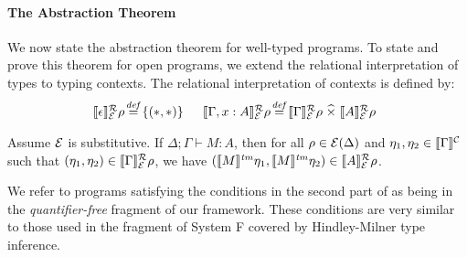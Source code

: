 \paragraph{The Abstraction Theorem}

We now state the abstraction theorem for well-typed programs. To state
and prove this theorem for open programs, we extend the
relational interpretation of types to typing contexts. The relational
interpretation of contexts is defined by: %
\begin{displaymath}
  \begin{array}{@{}l@{\hspace{0.1em}\isDefinedAs\hspace{0.1em}}l@{\hspace{1.5em}}l@{\hspace{0.1em}\isDefinedAs\hspace{0.1em}}l}
    \rsem{\epsilon}{\relEnv{E}}{\rho} & \{(*,*)\} &
    \rsem{\Gamma, x : A}{\relEnv{E}}{\rho} & \rsem{\Gamma}{\relEnv{E}}\rho \relTimes \rsem{A}{\relEnv{E}}\rho
  \end{array}
\end{displaymath}

\begin{theorem}[Abstraction]\label{thm:abstraction}
  Assume $\mathcal{E}$ is substitutive. If $\Delta; \Gamma \vdash M :
  A$, then for all $\rho \in \mathcal{E}(\Delta)$ and $\eta_1, \eta_2
  \in \llbracket \Gamma \rrbracket^{\mathcal{C}}$ such that $(\eta_1, \eta_2) \in
  \llbracket \Gamma \rrbracket^{\mathcal{R}}_{\mathcal{E}}{\rho}$, we have $(\llbracket M \rrbracket^{\mathit{tm}}\eta_1,
  \llbracket M \rrbracket^{\mathit{tm}}\eta_2) \in \llbracket A \rrbracket^{\mathcal{R}}_{\mathcal{E}}{\rho}$.
\end{theorem}

We refer to programs satisfying the conditions in the second part of
 as being in the \emph{quantifier-free}
fragment of our framework. These conditions are very similar to those
used in the fragment of System F covered by Hindley-Milner type
inference.

